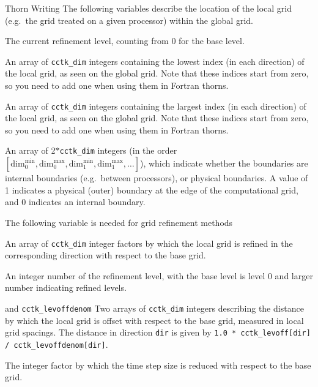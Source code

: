 \begin{cactuspart}{Thorn Writing}
The following variables describe the location of the local
grid (e.g.\ the grid treated on a given processor) within
the global grid.
\begin{Lentry}
\item [\texttt{cctk\_level}]
      The current refinement level, counting from $0$ for the base level.
\item [\texttt{cctk\_lbnd}]
      An array of \texttt{cctk\_dim} integers
      containing the lowest index (in each direction)
      of the local grid, as seen on the global grid. Note that these indices
      start from zero, so you need to add one when using them in
      Fortran thorns.
\item [\texttt{cctk\_ubnd}]
      An array of \texttt{cctk\_dim} integers
      containing the largest index (in each direction)
      of the local grid, as seen on the global grid.  Note that these indices
      start from zero, so you need to add one when using them in
      Fortran thorns.
\item [\texttt{cctk\_bbox}]
      An array of 2$*$\texttt{cctk\_dim} integers (in the order
        $[\mbox{dim}_0^{\mbox{min}}, \mbox{dim}_0^{\mbox{max}},
        \mbox{dim}_1^{\mbox{min}}, \mbox{dim}_1^{\mbox{max}}, \ldots]$),
      which indicate whether the boundaries are internal boundaries
      (e.g.\ between processors), or physical boundaries.
      A value of 1 indicates
      a physical (outer) boundary at the edge of the computational grid,
      and 0 indicates an internal boundary.
\end{Lentry}

The following variable is needed for grid refinement methods
\begin{Lentry}
\item [\texttt{cctk\_levfac}] An array of \texttt{cctk\_dim} integer factors
        by which the local grid is refined in the corresponding
        direction with respect to the base grid.
\item [\texttt{cctk\_level}] An integer number of the refinement level,
        with the base level is level $0$ and larger number indicating
        refined levels.
\item [\texttt{cctk\_levoff}] and \texttt{cctk\_levoffdenom} Two arrays of
        \texttt{cctk\_dim} integers describing the distance by which the
        local grid is offset with respect to the base grid, measured
        in local grid spacings.  The distance in direction \texttt{dir}
        is given by \texttt{1.0 * cctk\_levoff[dir] /
        cctk\_levoffdenom[dir]}.
\item [\texttt{cctk\_timefac}] The integer factor
        by which the time step size is reduced with respect to the
        base grid.
\end{Lentry}


\end{cactuspart}
